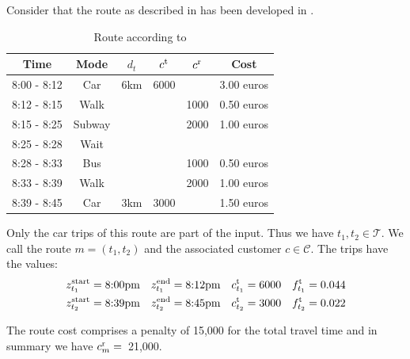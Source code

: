 \begin{example}
\label{ex:example_route}

Consider that the route as described in  has been developed in . 

\begin{table}[htb]
	\centering
	\begin{tabular}{cccccc}
		\toprule
		Time & Mode & $d_t$ & $c^{\operatorname{t}}$ & $c^{\operatorname{r}}$ & Cost \\
		\midrule
		8:00 - 8:12 & Car & 6km & 6000 & & 3.00 euros \\
		8:12 - 8:15 & Walk & & & 1000 & 0.50 euros \\
		8:15 - 8:25	& Subway & & & 2000 & 1.00 euros \\
		8:25 - 8:28 & Wait & & & & \\
		8:28 - 8:33 & Bus & & & 1000 & 0.50 euros \\
		8:33 - 8:39 & Walk & & & 2000 & 1.00 euros \\
		8:39 - 8:45 & Car & 3km & 3000 & & 1.50 euros \\
		\bottomrule
	\end{tabular}
	\caption{Route according to }
	\label{tab:exemplary_route}
\end{table}

Only the car trips of this route are part of the input. Thus we have $t_1,t_2\in\mathcal{T}$. We call the route ${m=\left(t_1,t_2\right)}$ and the associated customer $c\in\mathcal{C}$. The trips have the values:
\begin{align*}
	z^{\operatorname{start}}_{t_1} = \text{8:00pm} && z^{\operatorname{end}}_{t_1} = \text{8:12pm} && c^{\operatorname{t}}_{t_1} = 6000 && f^{\operatorname{t}}_{t_1} = 0.044 \\
	z^{\operatorname{start}}_{t_2} = \text{8:39pm} && z^{\operatorname{end}}_{t_2} = \text{8:45pm} && c^{\operatorname{t}}_{t_2} = 3000 && f^{\operatorname{t}}_{t_2} = 0.022
\end{align*}

The route cost comprises a penalty of 15,000 for the total travel time and in summary we have ${c^{\operatorname{r}}_m =}$~21,000.

\end{example}